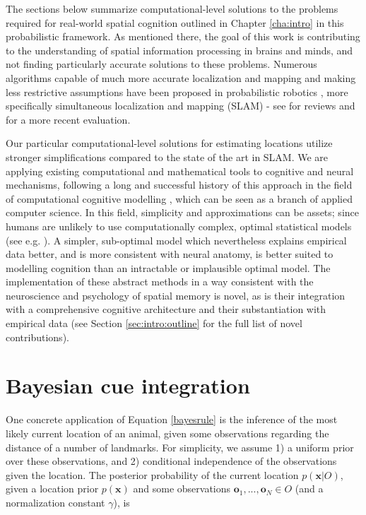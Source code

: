The sections below summarize computational-level solutions to the problems required for real-world spatial cognition outlined in Chapter \ref{cha:intro} in this probabilistic framework. As mentioned there, the goal of this work is contributing to the understanding of spatial information processing in brains and minds, and not finding particularly accurate solutions to these problems. Numerous algorithms capable of much more accurate localization and mapping and making less restrictive assumptions have been proposed in probabilistic robotics \citep{thrun2005probabilistic}, more specifically simultaneous localization and mapping (SLAM) - see \citep{thrun2008simultaneous,durrant2006simultaneous,bailey2006simultaneous} for reviews and \citep{tuna2012evaluations} for a more recent evaluation. 

Our particular computational-level solutions for estimating locations utilize stronger simplifications compared to the state of the art in SLAM. We are applying existing computational and mathematical tools to cognitive and neural mechanisms, following a long and successful history of this approach in the field of computational cognitive modelling \citep{sun2008introduction}, which can be seen as a branch of applied computer science. In this field, simplicity and approximations can be assets; since humans are unlikely to use computationally complex, optimal statistical models (see e.g. \citep{van2008tractable,simon1955behavioral}). A simpler, sub-optimal model which nevertheless explains empirical data better, and is more consistent with neural anatomy, is better suited to modelling cognition than an intractable or implausible optimal model. The implementation of these abstract methods in a way consistent with the neuroscience and psychology of spatial memory is novel, as is their integration with a comprehensive cognitive architecture and their substantiation with empirical data (see Section \ref{sec:intro:outline} for the full list of novel contributions). 

\section{Bayesian cue integration}
\label{sec:bayescue}

One concrete application of Equation \ref{bayesrule} is the inference of the most likely current location of an animal, given some observations regarding the distance of a number of landmarks. For simplicity, we assume 1) a uniform prior over these observations, and 2) conditional independence of the observations given the location. The posterior probability of the current location $p(\bm x | O)$, given a location prior $p(\bm x)$ and some observations $\bm o_1, ..., \bm o_N \in O$ (and a normalization constant $\gamma$), is 

